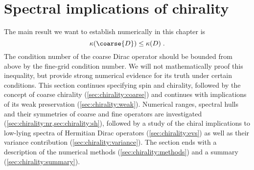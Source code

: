 \chapter{Spectral implications of chirality}
\label{ch:p2:chirality}






The main result we want to establish numerically in this chapter is
\begin{equation} \label{eq:cond:init}
\kappa(\coarse{D}) \leq \kappa(D) \;.
\end{equation}
The condition number of the coarse Dirac operator should be bounded from above by the fine-grid condition number.
We will not mathematically proof this inequality, but provide strong numerical evidence for its truth under certain conditions.
This section continues specifying spin and chirality, followed by the concept of coarse chirality (\cref{sec:chirality:coarse}) and continues with implications of its weak preservation (\cref{sec:chirality:weak}).
Numerical ranges, spectral hulls and their symmetries of coarse and fine operators are investigated (\cref{sec:chirality:nr,sec:chirality:sh}), followed by a study of the chiral implications to low-lying spectra of Hermitian Dirac operators (\cref{sec:chirality:evs}) as well as their variance contribution (\cref{sec:chirality:variance}).
The section ends with a description of the numerical methods (\cref{sec:chirality:methods}) and a summary (\cref{sec:chirality:summary}).

